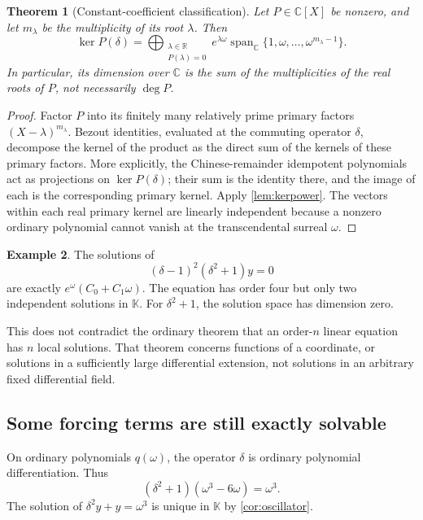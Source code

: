 \documentclass[11pt,letterpaper]{article}
\numberwithin{equation}{section}
\newtheorem{theorem}{Theorem}[section]
\theoremstyle{definition}
\newtheorem{example}[theorem]{Example}
\theoremstyle{remark}
\newcommand{\K}{\mathbb K}
\newcommand{\R}{\mathbb R}
\newcommand{\C}{\mathbb C}
\newcommand{\Span}{\operatorname{span}}
\begin{document}
\begin{theorem}[Constant-coefficient classification]\label{thm:constantcoeff}
Let $P\in\C[X]$ be nonzero, and let $m_\lambda$ be the multiplicity of its root $\lambda$. Then
\begin{equation}\label{eq:constantkernel}
 \ker P(\delta)
 =\bigoplus_{\substack{\lambda\in\R\\P(\lambda)=0}}
 e^{\lambda\omega}
 \Span_{\C}\{1,\omega,\ldots,\omega^{m_\lambda-1}\}.
\end{equation}
In particular, its dimension over $\C$ is the sum of the multiplicities of the \emph{real} roots of $P$, not necessarily $\deg P$.
\end{theorem}
\begin{proof}
Factor $P$ into its finitely many relatively prime primary factors $(X-\lambda)^{m_\lambda}$. Bezout identities, evaluated at the commuting operator $\delta$, decompose the kernel of the product as the direct sum of the kernels of these primary factors. More explicitly, the Chinese-remainder idempotent polynomials act as projections on $\ker P(\delta)$; their sum is the identity there, and the image of each is the corresponding primary kernel. Apply \cref{lem:kerpower}. The vectors within each real primary kernel are linearly independent because a nonzero ordinary polynomial cannot vanish at the transcendental surreal $\omega$.
\end{proof}

\begin{example}
The solutions of
\[
 (\delta-1)^2(\delta^2+1)y=0
\]
are exactly $e^\omega(C_0+C_1\omega)$. The equation has order four but only two independent solutions in $\K$. For $\delta^2+1$, the solution space has dimension zero.
\end{example}

This does not contradict the ordinary theorem that an order-$n$ linear equation has $n$ local solutions. That theorem concerns functions of a coordinate, or solutions in a sufficiently large differential extension, not solutions in an arbitrary fixed differential field.

\subsection{Some forcing terms are still exactly solvable}
On ordinary polynomials $q(\omega)$, the operator $\delta$ is ordinary polynomial differentiation. Thus
\[
 (\delta^2+1)(\omega^3-6\omega)=\omega^3.
\]
The solution of $\delta^2y+y=\omega^3$ is unique in $\K$ by \cref{cor:oscillator}.
\end{document}
